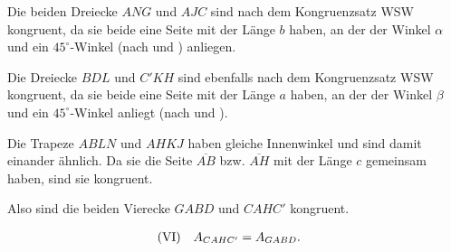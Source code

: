 \documentclass[a4paper,12pt]{article}
\begin{document}
\begin{figwindow}

Die beiden Dreiecke $ANG$ und $AJC$ sind nach dem Kongruenzsatz WSW kongruent, da sie beide eine Seite mit der Länge $b$ haben, an der der Winkel $\alpha$ und ein $45^\circ$-Winkel (nach  und ) anliegen.

Die Dreiecke $BDL$ und $C'KH$ sind ebenfalls nach dem Kongruenzsatz WSW kongruent, da sie beide eine Seite mit der Länge $a$ haben, an der der Winkel $\beta$ und ein $45^\circ$-Winkel anliegt (nach  und ).

Die Trapeze $ABLN$ und $AHKJ$ haben gleiche Innenwinkel und sind damit einander ähnlich. Da sie die Seite $\overline{AB}$ bzw. $\overline{AH}$ mit der Länge $c$ gemeinsam haben, sind sie kongruent.

\end{figwindow}

Also sind die beiden Vierecke $GABD$ und $CAHC'$ kongruent.

\begin{align*}
(\textrm{\rom{6}}) \quad A_{CAHC'} &= A_{GABD}.
\end{align*}
\end{document}
